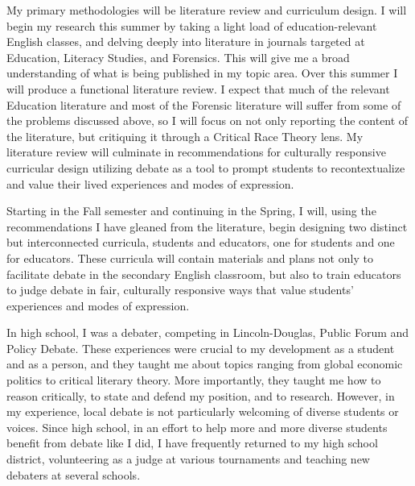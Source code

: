 \documentclass[man,12pt,natbib]{apa6}
\begin{document}
My primary methodologies will be literature review and curriculum design.
I will begin my research this summer by taking a light load of
education-relevant English classes, and delving deeply into literature in
journals targeted at Education, Literacy Studies, and Forensics. This will give
me a broad understanding of what is being published in my topic area. Over this
summer I will produce a functional literature review. I expect that much of the
relevant Education literature and most of the Forensic literature will suffer
from some of the problems discussed above, so I will focus on not only
reporting the content of the literature, but critiquing it through a Critical
Race Theory lens. My literature review will culminate in recommendations for
culturally responsive curricular design utilizing debate as a tool to prompt
students to recontextualize and value their lived experiences and modes of
expression.

Starting in the Fall semester and continuing in the Spring, I will, using the
recommendations I have gleaned from the literature, begin designing two
distinct but interconnected curricula, students and educators, one for students
and one for educators. These curricula will contain materials and plans not
only to facilitate debate in the secondary English classroom, but also to train
educators to judge debate in fair, culturally responsive ways that value
students' experiences and modes of expression.


In high school, I was a debater, competing in Lincoln-Douglas, Public Forum and
Policy Debate. These experiences were crucial to my development as a student
and as a person, and they taught me about topics ranging from global economic
politics to critical literary theory. More importantly, they taught me how to
reason critically, to state and defend my position, and to research. However,
in my experience, local debate is not particularly welcoming of diverse
students or voices. Since high school, in an effort to help more and more
diverse students benefit from debate like I did, I have frequently returned to
my high school district, volunteering as a judge at various tournaments and
teaching new debaters at several schools. 
\end{document}
